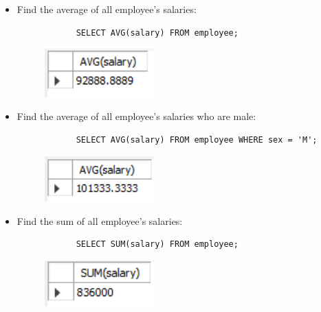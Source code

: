\begin{itemize}
    \item Find the average of all employee's salaries:
        \begin{verbatim}
            SELECT AVG(salary) FROM employee;
        \end{verbatim}
        \begin{figure}[H]
            \centering
            \includegraphics[width=0.4\textwidth]{./Figs/2020-12-24-20-54-52.png}
        \end{figure}
    
    \item Find the average of all employee's salaries who are male:
        \begin{verbatim}
            SELECT AVG(salary) FROM employee WHERE sex = 'M';
        \end{verbatim}
        \begin{figure}[H]
            \centering
            \includegraphics[width=0.4\textwidth]{./Figs/2020-12-24-20-55-56.png}
        \end{figure}
    
    \item Find the sum of all employee's salaries:
        \begin{verbatim}
            SELECT SUM(salary) FROM employee;
        \end{verbatim}
        \begin{figure}[H]
            \centering
            \includegraphics[width=0.4\textwidth]{./Figs/2020-12-24-20-55-34.png}
        \end{figure}
    

\end{itemize}
